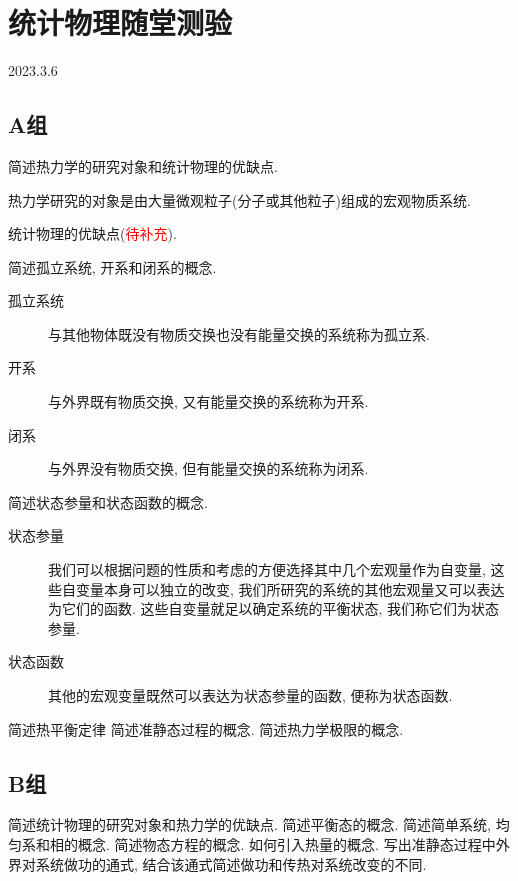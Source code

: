 \section{统计物理随堂测验}
2023.3.6
\subsection{A组}
\begin{questions}
  \question 简述热力学的研究对象和统计物理的优缺点.
  \begin{solution}
    热力学研究的对象是由大量微观粒子(分子或其他粒子)组成的宏观物质系统.

    统计物理的优缺点(\textcolor{red}{待补充}).
  \end{solution}
  \question 简述孤立系统, 开系和闭系的概念.
  \begin{solution}
    \begin{description}
      \item[孤立系统] 与其他物体既没有物质交换也没有能量交换的系统称为孤立系.
      \item[开系] 与外界既有物质交换, 又有能量交换的系统称为开系.
      \item[闭系] 与外界没有物质交换, 但有能量交换的系统称为闭系.
    \end{description}
  \end{solution}
  \question 简述状态参量和状态函数的概念.
  \begin{solution}
    \begin{description}
      \item[状态参量]  我们可以根据问题的性质和考虑的方便选择其中几个宏观量作为自变量, 这些自变量本身可以独立的改变, 我们所研究的系统的其他宏观量又可以表达为它们的函数. 这些自变量就足以确定系统的平衡状态, 我们称它们为状态参量.
      \item[状态函数] 其他的宏观变量既然可以表达为状态参量的函数, 便称为状态函数.
    \end{description}
  \end{solution}
  \question 简述热平衡定律
  \question 简述准静态过程的概念.
  \question 简述热力学极限的概念.
\end{questions}
\subsection{B组}
\begin{questions}
  \question 简述统计物理的研究对象和热力学的优缺点.
  \question 简述平衡态的概念.
  \question 简述简单系统, 均匀系和相的概念.
  \question 简述物态方程的概念.
  \question 如何引入热量的概念.
  \question 写出准静态过程中外界对系统做功的通式, 结合该通式简述做功和传热对系统改变的不同.
\end{questions}